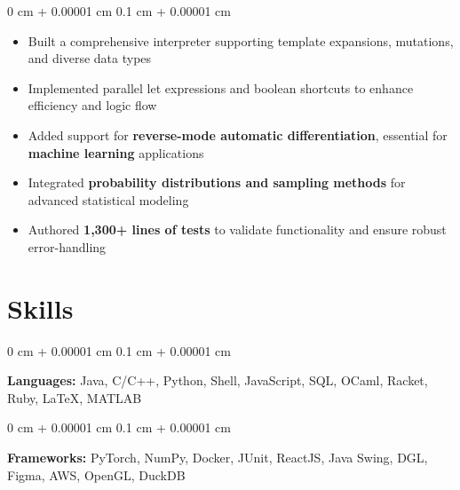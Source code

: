 \documentclass[10pt, letterpaper]{article}
\newenvironment{highlights}{
    \begin{itemize}[
        topsep=0.1 cm,
        parsep=0.10 cm,
        partopsep=0pt,
        itemsep=0pt,
        leftmargin=0.4 cm + 10pt
    ]
}{
    \end{itemize}
} %
\newenvironment{onecolentry}{
    \begin{adjustwidth}{
        0 cm + 0.00001 cm
    }{
        0.1 cm + 0.00001 cm
    }
}{
    \end{adjustwidth}
} %
\begin{document}
        \vspace{0.10 cm}
        \begin{onecolentry}
            \begin{highlights}
\item Built a comprehensive interpreter supporting template expansions, mutations, and diverse data types
\item Implemented parallel let expressions and boolean shortcuts to enhance efficiency and logic flow
\item Added support for \textbf{reverse-mode automatic differentiation}, essential for \textbf{machine learning} applications
\item Integrated \textbf{probability distributions and sampling methods} for advanced statistical modeling
\item Authored \textbf{1,300+ lines of tests} to validate functionality and ensure robust error-handling
            \end{highlights}
        \end{onecolentry}


        



    
    \section{Skills}

        
        \begin{onecolentry}
            \textbf{Languages:} Java, C/C++, Python, Shell, JavaScript, SQL, OCaml, Racket, Ruby, LaTeX, MATLAB
        \end{onecolentry}

        \vspace{0.2 cm}

        \begin{onecolentry}
            \textbf{Frameworks:} PyTorch, NumPy, Docker, JUnit, ReactJS, Java Swing, DGL, Figma, AWS, OpenGL, DuckDB
        \end{onecolentry}
\end{document}

